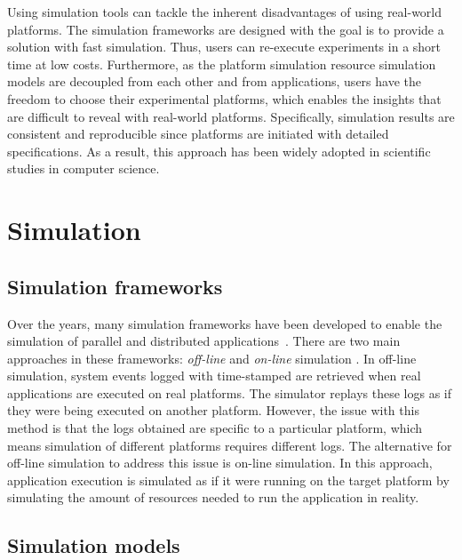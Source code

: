 Using simulation tools can tackle the inherent disadvantages of using 
real-world platforms. 
The simulation frameworks are designed with the goal is to provide 
a solution with fast simulation. 
Thus, users can re-execute experiments in a short time at low costs.
Furthermore, as the platform simulation resource simulation models 
are decoupled from each other and from applications, users have 
the freedom to choose their experimental platforms, which enables the 
insights that are difficult to reveal with real-world platforms. 
Specifically, simulation results are consistent and reproducible since 
platforms are initiated with detailed specifications. 
As a result, this approach has been widely adopted in scientific studies
in computer science. 

\section{Simulation}

\subsection{Simulation frameworks}

Over the years, many simulation frameworks have been developed to enable 
the simulation of parallel and distributed 
applications~\cite{optorsim, gridsim, groudsim, cloudsim,
nunez2012simcan,nunez2012icancloud, mdcsim, dissect_cf,
cloudnetsimplusplus, fognetsimplusplus, casanova2014simgrid,
ROSS, casanova2020fgcs}. 
There are two main approaches in these frameworks: \textit{off-line} and 
\textit{on-line} simulation \cite{casanova2014simgrid}. 
In off-line simulation, system events logged with time-stamped are retrieved 
when real applications are executed on real platforms.
The simulator replays these logs as if they were being executed 
on another platform. 
However, the issue with this method is that the logs obtained are specific to 
a particular platform, which means simulation of different platforms 
requires different logs.
The alternative for off-line simulation to address this issue is 
on-line simulation.
In this approach, application execution is simulated as if it were running 
on the target platform by simulating the amount of resources needed 
to run the application in reality. 

\subsection{Simulation models}


